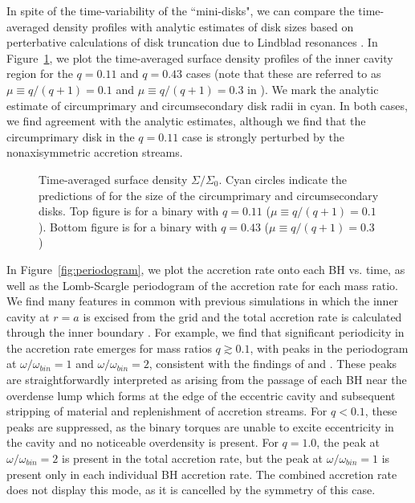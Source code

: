 \documentclass[apj]{emulateapj}
\begin{document}
In spite of the time-variability of the ``mini-disks", we can compare the time-averaged density profiles with analytic estimates of disk sizes based on perterbative calculations of disk truncation due to Lindblad resonances \citep{artymowicz94}. In Figure~\ref{fig:tavg_surf_dens}, we plot the time-averaged surface density profiles of the inner cavity region for the $q = 0.11$ and $q = 0.43$ cases (note that these are referred to as $\mu \equiv q/(q+1) = 0.1$ and $\mu \equiv q/(q+1) = 0.3$ in \citealt{artymowicz94}). We mark the analytic estimate of circumprimary and circumsecondary disk radii in cyan. In both cases, we find agreement with the analytic estimates, although we find that the circumprimary disk in the $q=0.11$ case is strongly perturbed by the nonaxisymmetric accretion streams. 

\begin{figure}
\caption{Time-averaged surface density $\Sigma / \Sigma_0$. Cyan circles indicate the predictions of \citet{artymowicz94} for the size of the circumprimary and circumsecondary disks. Top figure is for a binary with $q=0.11$ ($\mu \equiv q/(q+1) = 0.1$). Bottom figure is for a binary with $q=0.43$ ($\mu \equiv q/(q+1) = 0.3$) }
\label{fig:tavg_surf_dens}
\end{figure}

In Figure~\ref{fig:periodogram}, we plot the accretion rate onto each BH vs. time, as well as the Lomb-Scargle periodogram of the accretion rate for each mass ratio. We find many features in common with previous simulations in which the inner cavity at $r=a$ is excised from the grid and the total accretion rate is calculated through the inner boundary \citep{macfadyen08,dorazio13}. For example, we find that significant periodicity in the accretion rate emerges for mass ratios $q \gtrsim 0.1$, with peaks in the periodogram at $\omega /\omega_{bin}=1$ and $\omega / \omega_{bin}=2$, consistent with the findings of \citet{dorazio13} and \citet{roedig11}. These peaks are straightforwardly interpreted as arising from the passage of each BH near the overdense lump which forms at the edge of the eccentric cavity and subsequent stripping of material and replenishment of accretion streams. For $q<0.1$, these peaks are suppressed, as the binary torques are unable to excite eccentricity in the cavity and no noticeable overdensity is present. For $q=1.0$, the peak at $\omega / \omega_{bin}=2$ is present in the total accretion rate, but the peak at $\omega / \omega_{bin}=1$ is present only in each individual BH accretion rate. The combined accretion rate does not display this mode, as it is cancelled by the symmetry of this case. 
\end{document}

